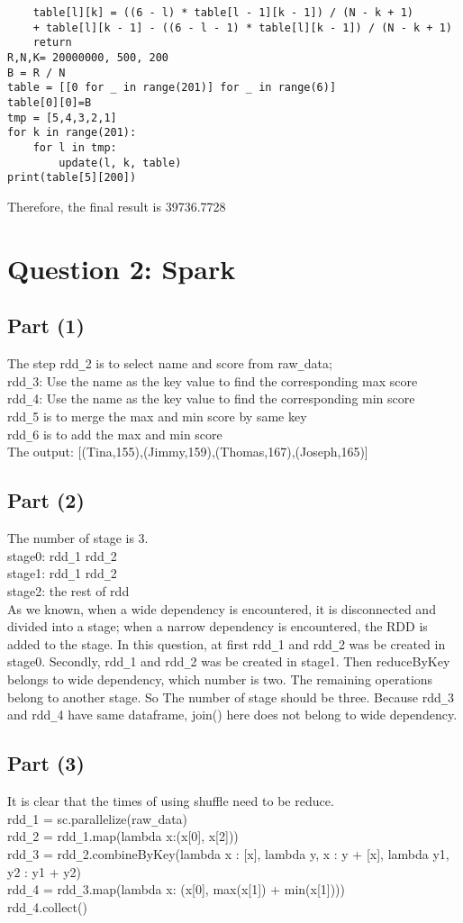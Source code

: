 \documentclass{article}
\begin{document}
\begin{itemize}
\begin{lstlisting}
	table[l][k] = ((6 - l) * table[l - 1][k - 1]) / (N - k + 1) 
	+ table[l][k - 1] - ((6 - l - 1) * table[l][k - 1]) / (N - k + 1)
	return
R,N,K= 20000000, 500, 200
B = R / N
table = [[0 for _ in range(201)] for _ in range(6)]
table[0][0]=B
tmp = [5,4,3,2,1]
for k in range(201):
	for l in tmp:
		update(l, k, table)
print(table[5][200])
\end{lstlisting}
Therefore, the final result is 39736.7728
\section*{Question 2: Spark}
\subsection*{Part (1)}
The step rdd\verb|_|2 is to select name and score from raw\verb|_|data;\\
rdd\verb|_|3: Use the name as the key value to find the corresponding max score\\
rdd\verb|_|4: Use the name as the key value to find the corresponding min score\\
rdd\verb|_|5 is to merge the max and min score by same key\\
rdd\verb|_|6 is to add the max and min score\\
The output: [(Tina,155),(Jimmy,159),(Thomas,167),(Joseph,165)]

\subsection*{Part (2)}
The number of stage is 3.\\
stage0: rdd\verb|_|1 rdd\verb|_|2 \\
stage1: rdd\verb|_|1 rdd\verb|_|2 \\
stage2: the rest of rdd\\
As we known, when a wide dependency is encountered, it is disconnected and divided into a stage; when a narrow dependency is encountered, the RDD is added to the stage. In this question, at first rdd\verb|_|1 and rdd\verb|_|2 was be created in stage0. Secondly, rdd\verb|_|1 and rdd\verb|_|2 was be created in stage1. Then reduceByKey belongs to wide dependency, which number is two. The remaining operations belong to another stage. So The number of stage  should be three. Because rdd\verb|_|3 and rdd\verb|_|4 have same dataframe, join() here does not belong to wide dependency.
\subsection*{Part (3)}
It is clear that the times of using shuffle need to be reduce.\\
rdd\verb|_|1 = sc.parallelize(raw\verb|_|data)\\
rdd\verb|_|2 = rdd\verb|_|1.map(lambda x:(x[0], x[2]))\\
rdd\verb|_|3 = rdd\verb|_|2.combineByKey(lambda x : [x], lambda y, x : y + [x], lambda y1, y2 : y1 + y2)\\
rdd\verb|_|4 = rdd\verb|_|3.map(lambda x: (x[0], max(x[1]) + min(x[1])))\\
rdd\verb|_|4.collect()


\end{itemize}
\end{document}
